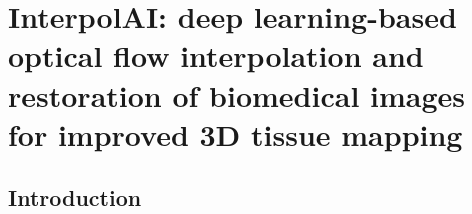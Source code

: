 \chapter{InterpolAI: deep learning-based optical flow interpolation and restoration of biomedical images for improved 3D tissue mapping} \label{chap:chap-6}

\begin{refsection}
    \section{Introduction}


    
    \clearpage
    \printbibliography[heading=subbibliography, title={References}]
\end{refsection}